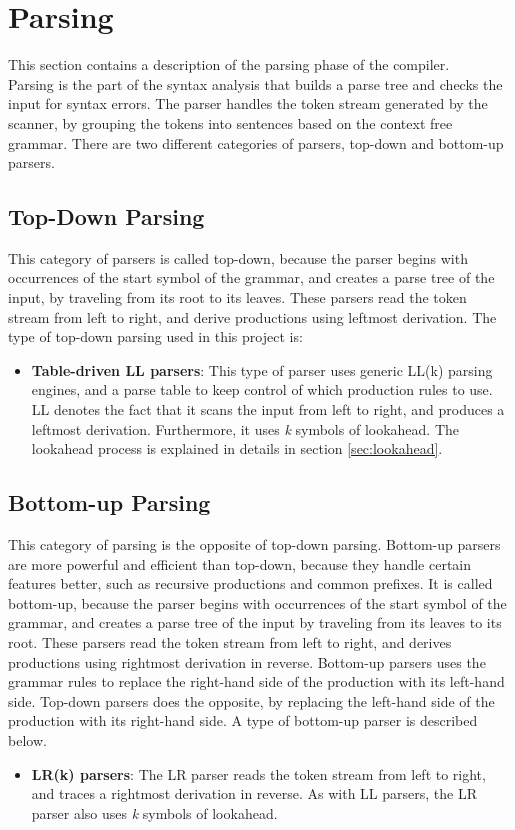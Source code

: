 \section{Parsing}
This section contains a description of the parsing phase of the compiler. 
\\Parsing is the part of the syntax analysis that builds a parse tree and checks the input for syntax errors. The parser handles the token stream generated by the scanner, by grouping the tokens into sentences based on the context free grammar. There are two different categories of parsers, top-down and bottom-up parsers.

\subsection{Top-Down Parsing}
This category of parsers is called top-down, because the parser begins with occurrences of the start symbol of the grammar, and creates a parse tree of the input, by traveling from its root to its leaves. These parsers read the token stream from left to right, and derive productions using leftmost derivation. \cite{compiler:CAC} The type of top-down parsing used in this project is:

\begin{itemize}
\item \textbf{Table-driven LL parsers}: This type of parser uses generic LL(k) parsing engines, and a parse table to keep control of which production rules to use. LL denotes the fact that it scans the input from left to right, and produces a leftmost derivation. Furthermore, it uses \textit{k} symbols of lookahead. The lookahead process is explained in details in section \ref{sec:lookahead}.
\end{itemize}

\subsection{Bottom-up Parsing}
This category of parsing is the opposite of top-down parsing. Bottom-up parsers are more powerful and efficient than top-down, because they handle certain features better, such as recursive productions and common prefixes. It is called bottom-up, because the parser begins with occurrences of the start symbol of the grammar, and creates a parse tree of the input by traveling from its leaves to its root. These parsers read the token stream from left to right, and derives productions using rightmost derivation in reverse. Bottom-up parsers uses the grammar rules to replace the right-hand side of the production with its left-hand side. Top-down parsers does the opposite, by replacing the left-hand side of the production with its right-hand side. A type of bottom-up parser is described below. 

\begin{itemize}
\item \textbf{LR(k) parsers}: The LR parser reads the token stream from left to right, and traces a rightmost derivation in reverse. As with LL parsers, the LR parser also uses \textit{k} symbols of lookahead.  
\end{itemize}
